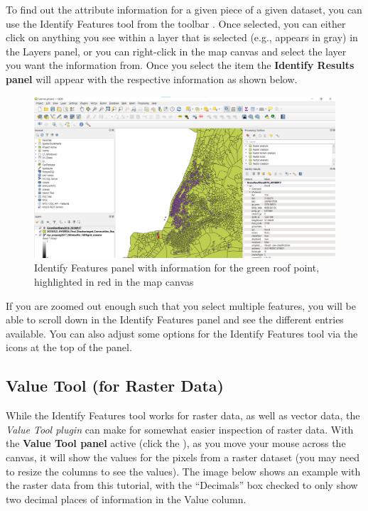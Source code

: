 \documentclass[
  letterpaper,
  DIV=11,
  numbers=noendperiod]{scrreprt}
\begin{document}
To find out the attribute information for a given piece of a given
dataset, you can use the Identify Features tool from the toolbar
. Once selected,
you can either click on anything you see within a layer that is selected
(e.g., appears in gray) in the Layers panel, or you can right-click in
the map canvas and select the layer you want the information from. Once
you select the item the \textbf{Identify Results panel} will appear with
the respective information as shown below.

\begin{figure}

{\centering \includegraphics{./images/IdentifyFeatures.png}

}

\caption{Identify Features panel with information for the green roof
point, highlighted in red in the map canvas}

\end{figure}

If you are zoomed out enough such that you select multiple features, you
will be able to scroll down in the Identify Features panel and see the
different entries available. You can also adjust some options for the
Identify Features tool via the icons at the top of the panel.

\hypertarget{value-tool-for-raster-data}{%
\subsection{Value Tool (for Raster
Data)}\label{value-tool-for-raster-data}}

While the Identify Features tool works for raster data, as well as
vector data, the \emph{Value Tool plugin} can make for somewhat easier
inspection of raster data. With the \textbf{Value Tool panel} active
(click the ), as you move your
mouse across the canvas, it will show the values for the pixels from a
raster dataset (you may need to resize the columns to see the values).
The image below shows an example with the raster data from this
tutorial, with the ``Decimals'' box checked to only show two decimal
places of information in the Value column.
\end{document}
